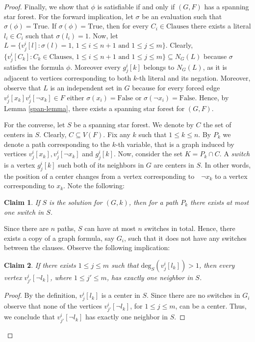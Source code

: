 \documentclass[en]{pracamgr}
\newtheorem{claim}{Claim}
\theoremstyle{definition}
\newcommand{\degree}[2]{\textrm{deg}_{#1}(#2)}
\newcommand{\true}{\textrm{True}}
\newcommand{\false}{\textrm{False}}
\begin{document}
\begin{proof}
	Finally, we show that $\phi$ is satisfiable if and only if $(G,F)$ has a spanning star forest. For the forward implication, let $\sigma$ be an evaluation such that $\sigma(\phi)=\true$. If $\sigma(\phi)=\textrm{True}$, then for every $C_i \in \textrm{Clauses}$ there exists a literal $l_i \in C_i$ such that $\sigma(l_i)=1$. Now, let $L = \{v^i_j[l]: \sigma(l)=1\text{, } 1 \leq i \leq n+1 \text{ and } 1 \leq j \leq m\}$. Clearly, $\{v^i_j[C_k]: C_k \in \textrm{Clauses} \text{, } 1 \leq i \leq n+1 \text{ and } 1 \leq j \leq m\} \subseteq N_G(L)$ because $\sigma$ satisfies the formula $\phi$. Moreover every $g^i_j[k]$ belongs to $N_G(L)$, as it is adjacent to vertices corresponding to both $k$-th literal and its negation. Moreover, observe that $L$ is an independent set in $G$ because for every forced edge $v^i_j[x_k]v^i_j[\neg x_k] \in F$ either $\sigma(x_i)=\false$ or $\sigma(\neg x_i)=\false$. Hence, by Lemma \ref{span-lemma}, there exists a spanning star forest for $(G,F)$.
	
	For the converse, let $S$ be a spanning star forest. We denote by $C$ the set of centers in $S$. Clearly, $C \subseteq V(F)$. Fix any $k$ such that $1 \leq k \leq n$. By $P_k$ we denote a path corresponding to the $k$-th variable, that is a graph induced by vertices $v^i_j[x_k],v^i_j[\neg x_k]$ and $g^i_j[k]$. Now, consider the set $K = P_k \cap C$. A \textit{switch} is a vertex $g^i_j[k]$ such both of its neighbors in $G$ are centers in $S$. In other words, the position of a center changes from a vertex corresponding to~~$\neg x_k$ to a vertex corresponding to $x_k$. Note the following:
	
	\begin{claim}\label{switch}
		If $S$ is the solution for $(G,k)$, then for a path $P_k$ there exists at most one switch in $S$.
	\end{claim}

	Since there are $n$ paths, $S$ can have at most $n$ switches in total. Hence, there exists a copy of a graph formula, say $G_i$, such that it does not have any switches between the clauses. Observe the following implication:
	
	\begin{claim}
		If there exists $1 \leq j \leq m$ such that $\degree{S}{v^i_j[l_k]}>1$, then every vertex $v^i_{j'}[\neg l_k]$, where $1 \leq j' \leq m$, has exactly one neighbor in $S$.
	\end{claim}

	\begin{proof}
		By the definition, $v^i_j[l_k]$ is a center in $S$. Since there are no switches in $G_i$ observe that none of the vertices $v^i_{j'}[\neg l_k]$,  for $1 \leq j \leq m$, can be a center. Thus, we conclude that $v^i_{j'}[\neg l_k]$ has exactly one neighbor in $S$.
	\end{proof}


\end{proof}
\end{document}
